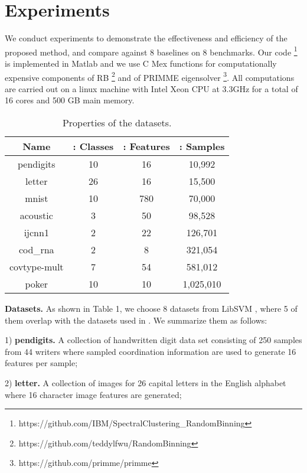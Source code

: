 \documentclass[sigconf]{acmart}
\newcommand{\1}{\boldsymbol{1}}
\newcommand{\0}{\boldsymbol{0}}
\begin{document}
\section{Experiments}
We conduct experiments to demonstrate the effectiveness and efficiency of the proposed method, and compare against 8 baselines on 8 benchmarks. Our code \footnote{https://github.com/IBM/SpectralClustering\_RandomBinning} is implemented in Matlab and we use C Mex functions for computationally expensive components of RB \footnote{https://github.com/teddylfwu/RandomBinning} and of PRIMME eigensolver \footnote{https://github.com/primme/primme}. All computations are carried out on a linux machine with Intel Xeon CPU at 3.3GHz for a total of 16 cores and 500 GB main memory. 
\begin{table}[htbp]
\centering
\caption{Properties of the datasets.} 
\vspace{0mm}
\label{tb: info of datasets}
\begin{center}
    \begin{tabular}{ c c c c}
    \hline
    Name 		 & : Classes & : Features & : Samples \\ \hline 
    pendigits 	 & 10  & 16  & 10,992 \\
    letter       & 26 & 16 & 15,500 \\
    mnist        & 10 & 780 & 70,000  \\ 
    acoustic     & 3  & 50 & 98,528  \\ 
    ijcnn1 		 & 2  & 22  & 126,701 \\ 
    cod\_rna     & 2  & 8  & 321,054  \\
    covtype-mult & 7  & 54 & 581,012 \\ 
    poker        & 10 & 10 & 1,025,010 \\ \hline
    \end{tabular}
\end{center}
\end{table}

\textbf{Datasets.} As shown in Table 1, we choose 8 datasets from LibSVM \cite{chang2011libsvm}, where 5 of them overlap with the datasets used in \cite{yan2009fast,li2016scalable,chen2011large}. We summarize them as follows:

1) \textbf{pendigits.} A collection of handwritten digit data set consisting of 250 samples from 44 writers where sampled coordination information are used to generate 16 features per sample;

2) \textbf{letter.} A collection of images for 26 capital letters in the English alphabet where 16 character image features are generated; 
\end{document}
